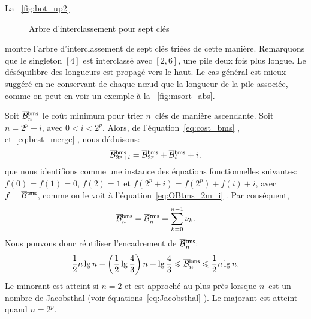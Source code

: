 La \fig~\vref{fig:bot_up2}
\begin{figure}[!b]
\centering
{}
\qquad
{}
\caption{Arbre d'interclassement pour sept clés}
\end{figure}
montre l'arbre d'interclassement
de sept clés triées de cette manière. Remarquons que le singleton
\([4]\) est interclassé avec \([2,6]\), une pile deux fois plus
longue. Le déséquilibre des longueurs est propagé vers le haut. Le cas
général est mieux suggéré en ne conservant de chaque n{\oe}ud que la
longueur de la pile associée, comme on peut en voir un exemple à la
\fig~\vref{fig:msort_abs}.


Soit \(\OB{\fun{bms}}{n}\) le coût
minimum pour trier \(n\)~clés de manière ascendante. Soit \(n=2^p+i\),
avec \(0 < i < 2^p\). Alors, de l'équation~\eqref{eq:cost_bms}
, et~\eqref{eq:best_merge}
, nous déduisons:
\begin{equation*}
\OB{\fun{bms}}{2^p+i} = \OB{\fun{bms}}{2^p} + \OB{\fun{bms}}{i} + i,
\end{equation*}
que nous identifions comme une instance des équations fonctionnelles
suivantes: \(f(0)=f(1)=0\), \(f(2)=1\) et \(f(2^p+i) = f(2^p) + f(i) +
i\), avec \(f=\OB{\fun{tms}}{}\), comme on le voit à
l'équation~\eqref{eq:OBtms_2m_i} . Par
conséquent,
\begin{equation}
\OB{\fun{bms}}{n} = \OB{\fun{tms}}{n} = \sum_{k=0}^{n-1}{\nu_k}.
\label{eq:OBbms}
\end{equation}
Nous pouvons donc réutiliser l'encadrement de \(\OB{\fun{tms}}{n}\):
\begin{equation}
\frac{1}{2}n\lg n - \left(\frac{1}{2}\lg\frac{4}{3}\right)n + \lg\frac{4}{3}
\leqslant \OB{\fun{bms}}{n} \leqslant
\frac{1}{2}n\lg n.
\index{bms@$\OB{\fun{bms}}{n}$}
\end{equation}
Le minorant est atteint si \(n=2\) et est approché au plus près
lorsque \(n\)~est un nombre de Jacobsthal (voir équations~\eqref{eq:Jacobsthal}
). Le majorant est atteint quand \(n=2^p\).


